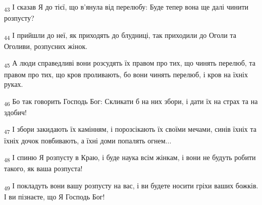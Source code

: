 \begin{tcolorbox}
\textsubscript{43} І сказав Я до тієї, що в'янула від перелюбу: Буде тепер вона ще далі чинити розпусту?
\end{tcolorbox}
\begin{tcolorbox}
\textsubscript{44} І прийшли до неї, як приходять до блудниці, так приходили до Оголи та Оголиви, розпусних жінок.
\end{tcolorbox}
\begin{tcolorbox}
\textsubscript{45} А люди справедливі вони розсудять їх правом про тих, що чинять перелюб, та правом про тих, що кров проливають, бо вони чинять перелюб, і кров на їхніх руках.
\end{tcolorbox}
\begin{tcolorbox}
\textsubscript{46} Бо так говорить Господь Бог: Скликати б на них збори, і дати їх на страх та на здобич!
\end{tcolorbox}
\begin{tcolorbox}
\textsubscript{47} І збори закидають їх камінням, і порозсікають їх своїми мечами, синів їхніх та їхніх дочок повбивають, а їхні доми попалять огнем...
\end{tcolorbox}
\begin{tcolorbox}
\textsubscript{48} І спиню Я розпусту в Краю, і буде наука всім жінкам, і вони не будуть робити такого, як ваша розпуста!
\end{tcolorbox}
\begin{tcolorbox}
\textsubscript{49} І покладуть вони вашу розпусту на вас, і ви будете носити гріхи ваших божків. І ви пізнаєте, що Я Господь Бог!
\end{tcolorbox}
